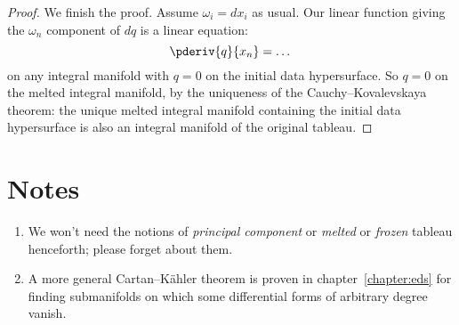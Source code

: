 \begin{proof}
We finish the proof.
Assume \(\omega_i=dx_i\) as usual.
Our linear function giving the \(\omega_n\) component of \(dq\) is a linear equation:
\[
\pderiv{q}{x_n} = \dots
\]
on any integral manifold with \(q=0\) on the initial data hypersurface.
So \(q=0\) on the melted integral manifold, by the uniqueness of the Cauchy--Kovalevskaya theorem: the unique melted integral manifold containing the initial data hypersurface is also an integral manifold of the original tableau.
\end{proof}




\section{Notes}

\begin{enumerate}
\item
We won't need the notions of \emph{principal component} 
or \emph{melted} 
or \emph{frozen} 
tableau henceforth; please forget about them.
\item
A more general Cartan--K\"ahler theorem is proven in chapter~\ref{chapter:eds} for finding submanifolds on which some differential forms of arbitrary degree vanish.
\end{enumerate}
